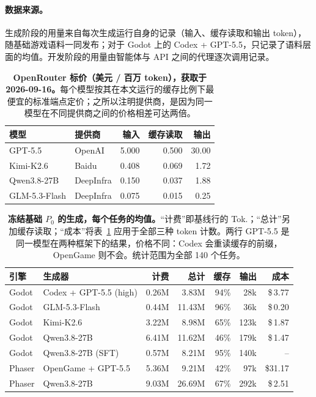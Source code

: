 \paragraph{数据来源。}生成阶段的用量来自每次生成运行自身的记录（输入、缓存读取和输出 token），随基础游戏语料一同发布；对于 Godot 上的 Codex + GPT-5.5，只记录了语料层面的均值。开发阶段的用量由智能体与 API 之间的代理逐次调用记录。

\begin{table}[htbp]
\caption{\textbf{OpenRouter 标价（美元 / 百万 token），获取于 2026-09-16。}每个模型按其在本文运行的缓存比例下最便宜的标准端点定价；之所以注明提供商，是因为同一模型在不同提供商之间的价格相差可达两倍。}
\label{tab:prices}
\centering\small
\begin{tabular}{@{}llrrr@{}}
\toprule
模型 & 提供商 & 输入 & 缓存读取 & 输出 \\
\midrule
GPT-5.5 & OpenAI & 5.000 & 0.500 & 30.00 \\
Kimi-K2.6 & Baidu & 0.408 & 0.069 & 1.72 \\
Qwen3.8-27B & DeepInfra & 0.150 & 0.037 & 1.88 \\
GLM-5.3-Flash & DeepInfra & 0.075 & 0.015 & 0.25 \\
\bottomrule
\end{tabular}
\end{table}

\begin{table}[htbp]
\caption{\textbf{冻结基础 $P_0$ 的生成，每个任务的均值。}“计费”即基线行的 Tok.；“总计”另加缓存读取；“成本”将表~\ref{tab:prices} 应用于全部三种 token 计数。两行 GPT-5.5 是同一模型在两种框架下的结果，价格不同：Codex 会重读缓存的前缀，OpenGame 则不会。统计范围为全部 140 个任务。}
\label{tab:gen}
\centering\small
\begin{tabular}{@{}llrrrrr@{}}
\toprule
引擎 & 生成器 & 计费 & 总计 & 缓存 & 输出 & 成本 \\
\midrule
Godot & Codex + GPT-5.5 (high) & 0.26M & 3.83M & 94\% & 28k & \$\,3.77 \\
Godot & GLM-5.3-Flash & 0.44M & 11.43M & 96\% & 36k & \$\,0.20 \\
Godot & Kimi-K2.6 & 3.22M & 8.98M & 65\% & 123k & \$\,1.87 \\
Godot & Qwen3.8-27B & 6.41M & 11.62M & 46\% & 179k & \$\,1.47 \\
Godot & Qwen3.8-27B (SFT) & 0.57M & 8.21M & 95\% & 140k & – \\
Phaser & OpenGame + GPT-5.5 & 5.36M & 9.21M & 42\% & 97k & \$31.17 \\
Phaser & Qwen3.8-27B & 9.03M & 26.69M & 67\% & 292k & \$\,2.51 \\
\bottomrule
\end{tabular}
\end{table}

